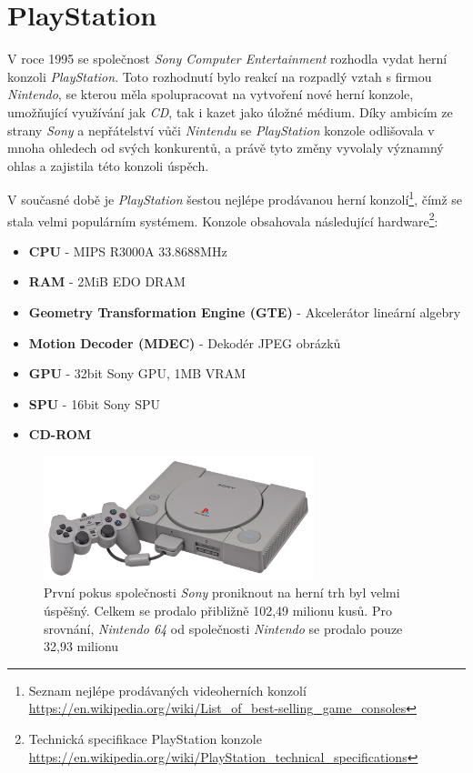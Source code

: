 \chapter{PlayStation}

V roce 1995 se společnost \textit{Sony Computer Entertainment} rozhodla vydat herní konzoli \textit{PlayStation}. 
Toto rozhodnutí bylo reakcí na rozpadlý vztah s firmou \textit{Nintendo}, se kterou měla spolupracovat na vytvoření nové herní konzole, 
umožňující využívání jak \textit{CD}, tak i kazet jako úložné médium. 
Díky ambicím ze strany \textit{Sony} a nepřátelství vůči \textit{Nintendu} se \textit{PlayStation} konzole odlišovala v mnoha ohledech od svých konkurentů, 
a právě tyto změny vyvolaly významný ohlas a zajistila této konzoli úspěch.

V současné době je \textit{PlayStation} šestou nejlépe prodávanou herní konzolí\footnote{Seznam nejlépe prodávaných videoherních konzolí \url{https://en.wikipedia.org/wiki/List_of_best-selling_game_consoles}}, čímž se stala velmi populárním systémem. 
Konzole obsahovala následující hardware\footnote{Technická specifikace PlayStation konzole \url{https://en.wikipedia.org/wiki/PlayStation_technical_specifications}}:

\begin{itemize}
    \label{Specifikace Hardwaru}
    \item{\textbf{CPU} - MIPS R3000A 33.8688MHz}
    \item{\textbf{RAM} - 2MiB EDO DRAM}
    \item{\textbf{Geometry Transformation Engine (GTE)} - Akcelerátor lineární algebry}
    \item{\textbf{Motion Decoder (MDEC)} - Dekodér JPEG obrázků}
    \item{\textbf{GPU} - 32bit Sony GPU, 1MB VRAM}
    \item{\textbf{SPU} - 16bit Sony SPU}
    \item{\textbf{CD-ROM}}
\end{itemize}

\begin{figure}[hbt]
	\centering
	\includegraphics[width=0.7\textwidth]{obrazky-figures/psx-console.jpg}
	\caption{První pokus společnosti \textit{Sony} proniknout na herní trh byl velmi úspěšný. Celkem se prodalo přibližně 102,49 milionu kusů. Pro srovnání, \textit{Nintendo 64} od společnosti \textit{Nintendo} se prodalo pouze 32,93 milionu}
	\label{psx-console}
\end{figure}

